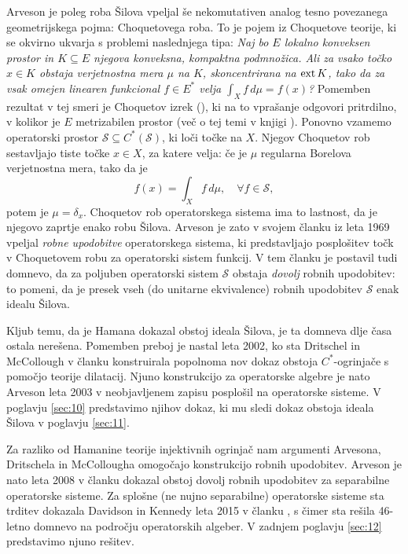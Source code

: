 Arveson je poleg roba Šilova vpeljal še nekomutativen analog tesno povezanega geometrijskega pojma: Choquetovega roba.
To je pojem iz Choquetove teorije, ki se okvirno ukvarja s problemi naslednjega tipa:
\emph{Naj bo $E$ lokalno konveksen prostor in $K \subseteq E$ njegova konveksna, kompaktna podmnožica.
Ali za vsako točko $x \in K$ obstaja verjetnostna mera $\mu$ na $K$, skoncentrirana na $\operatorname{ext} K$, tako da za vsak omejen linearen funkcional $f \in E^*$ velja $\int_X f\, d\mu = f(x)$?}
Pomemben rezultat v tej smeri je Choquetov izrek (\cite[str. 14]{phelps2001}), ki na to vprašanje odgovori pritrdilno, v kolikor je $E$ metrizabilen prostor (več o tej temi v knjigi \cite{phelps2001}).
Ponovno vzamemo operatorski prostor $\mathcal{S} \subseteq C^*(\mathcal{S})$, ki loči točke na $X$. 
Njegov Choquetov rob sestavljajo tiste točke $x \in X$, za katere velja:
če je $\mu$ regularna Borelova verjetnostna mera, tako da je $$f(x) = \int_X f\, d\mu,\quad \forall f \in \mathcal{S},$$
potem je $\mu = \delta_x$. Choquetov rob operatorskega sistema ima to lastnost, da je njegovo zaprtje enako robu Šilova.
Arveson je zato v svojem članku iz leta 1969 vpeljal \emph{robne upodobitve} operatorskega sistema, ki predstavljajo posplošitev točk v Choquetovem robu 
za operatorski sistem funkcij. V tem članku je postavil tudi domnevo, da za poljuben operatorski sistem $\mathcal{S}$ obstaja \emph{dovolj} robnih upodobitev:
to pomeni, da je presek vseh (do unitarne ekvivalence) robnih upodobitev $\mathcal{S}$ enak idealu Šilova.

Kljub temu, da je Hamana dokazal obstoj ideala Šilova, je ta domneva dlje časa ostala nerešena.
Pomemben preboj je nastal leta 2002, ko sta Dritschel in McCollough v članku \cite{dritschel2005}
konstruirala popolnoma nov dokaz obstoja $C^*$-ogrinjače s pomočjo teorije dilatacij. 
Njuno konstrukcijo za operatorske algebre je nato Arveson leta 2003 v neobjavljenem zapisu \cite{arveson2003} posplošil 
na operatorske sisteme. V poglavju \ref{sec:10} predstavimo njihov dokaz, ki mu sledi dokaz obstoja ideala Šilova v poglavju \ref{sec:11}.

Za razliko od Hamanine teorije injektivnih ogrinjač nam argumenti Arvesona, Dritschela in McCollougha omogočajo konstrukcijo robnih upodobitev.
Arveson je nato leta 2008 v članku \cite{arveson2008} dokazal obstoj dovolj robnih upodobitev za separabilne operatorske sisteme. 
Za splošne (ne nujno separabilne) operatorske sisteme sta trditev dokazala Davidson in Kennedy leta 2015 v članku \cite{davidson2015},
s čimer sta rešila 46-letno domnevo na področju operatorskih algeber.
V zadnjem poglavju \ref{sec:12} predstavimo njuno rešitev.






